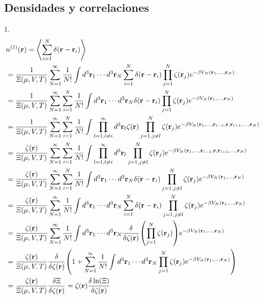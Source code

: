 \documentclass{article}
\begin{document}
\subsection{Densidades y correlaciones}

1.
\begin{align}
\begin{split}
&n^{(1)}(\vb{r})=\ev{\sum_{i=1}^N\delta(\vb{r}-\vb{r}_i)}\\
&=\frac{1}{\Xi(\mu,V,T)}\sum_{N=1}^\infty \frac{1}{N!}\int d^3\vb{r}_1\cdots d^3\vb{r}_N\sum_{i=1}^N\delta(\vb{r}-\vb{r}_i)\prod_{j=1}^N\zeta(\vb{r}_j)e^{-\beta V_N(\vb{r}_1,\dots,\vb{r}_N)}\\
&=\frac{1}{\Xi(\mu,V,T)}\sum_{N=1}^\infty\sum_{i=1}^N \frac{1}{N!}\int d^3\vb{r}_1\cdots d^3\vb{r}_N\delta(\vb{r}-\vb{r}_i)\prod_{j=1}^N\zeta(\vb{r}_j)e^{-\beta V_N(\vb{r}_1,\dots,\vb{r}_N)}\\
&=\frac{1}{\Xi(\mu,V,T)}\sum_{N=1}^\infty\sum_{i=1}^N \frac{1}{N!}\int \prod_{l=1,l\neq i}^\infty d^3\vb{r}_l\zeta(\vb{r})\prod_{j=1,j\neq l}^N\zeta(\vb{r}_j)e^{-\beta V_N(\vb{r}_1,\dots,\vb{r}_{i-1},\vb{r},\vb{r}_{i+1},\dots,\vb{r}_N)}\\
&=\frac{\zeta(\vb{r})}{\Xi(\mu,V,T)}\sum_{N=1}^\infty\sum_{i=1}^N \frac{1}{N!}\int \prod_{l=1,l\neq i}^\infty d^3\vb{r}_l\prod_{j=1,j\neq l}^N\zeta(\vb{r}_j)e^{-\beta V_N(\vb{r}_1,\dots,\vb{r}_{i-1},\vb{r},\vb{r}_{i+1},\dots,\vb{r}_N)}\\
&=\frac{\zeta(\vb{r})}{\Xi(\mu,V,T)}\sum_{N=1}^\infty\sum_{i=1}^N \frac{1}{N!}\int d^3\vb{r}_1\cdots d^3\vb{r}_N\delta(\vb{r}-\vb{r}_i)\prod_{j=1,j\neq l}^N\zeta(\vb{r}_j)e^{-\beta V_N(\vb{r}_1,\dots,\vb{r}_N)}\\
&=\frac{\zeta(\vb{r})}{\Xi(\mu,V,T)}\sum_{N=1}^\infty \frac{1}{N!}\int d^3\vb{r}_1\cdots d^3\vb{r}_N\sum_{i=1}^N\delta(\vb{r}-\vb{r}_i)\prod_{j=1,j\neq l}^N\zeta(\vb{r}_j)e^{-\beta V_N(\vb{r}_1,\dots,\vb{r}_N)}\\
&=\frac{\zeta(\vb{r})}{\Xi(\mu,V,T)}\sum_{N=1}^\infty \frac{1}{N!}\int d^3\vb{r}_1\cdots d^3\vb{r}_N\frac{\delta}{\delta \zeta(\vb{r})}\qty(\prod_{j=1}^N\zeta(\vb{r}_j))e^{-\beta V_N(\vb{r}_1,\dots,\vb{r}_N)}\\
&=\frac{\zeta(\vb{r})}{\Xi(\mu,V,T)}\frac{\delta}{\delta \zeta(\vb{r})}\qty(1+\sum_{N=1}^\infty \frac{1}{N!}\int d^3\vb{r}_1\cdots d^3\vb{r}_N\prod_{j=1}^N\zeta(\vb{r}_j)e^{-\beta V_N(\vb{r}_1,\dots,\vb{r}_N)})\\
&=\frac{\zeta(\vb{r})}{\Xi(\mu,V,T)}\frac{\delta\Xi}{\delta \zeta(\vb{r})}=\zeta(\vb{r})\frac{\delta\ln(\Xi)}{\delta \zeta(\vb{r})}
\end{split}
\end{align}
\end{document}
